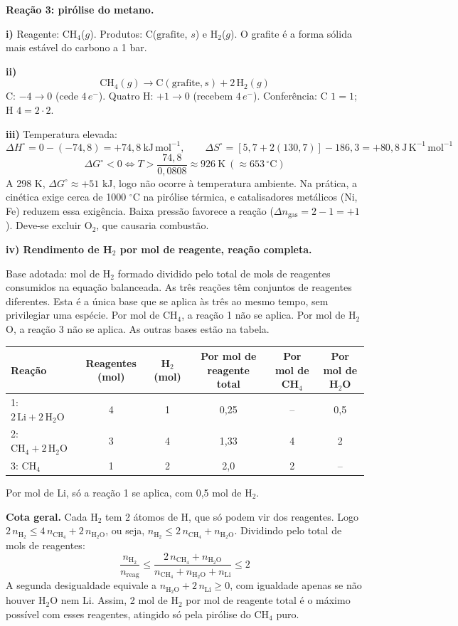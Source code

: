 \documentclass{article}%
\begin{document}
\textbf{Reação 3: pirólise do metano.}

\textbf{i)} Reagente: CH$_4$($g$). Produtos: C($\text{grafite}$, $s$) e H$_2$($g$). O grafite é a forma sólida mais estável do carbono a 1 bar.

\textbf{ii)}
\[ \mathrm{CH_4}(g) \rightarrow \mathrm{C}(\text{grafite}, s) + 2\,\mathrm{H_2}(g) \]
C: $-4 \rightarrow 0$ (cede $4\,e^-$). Quatro H: $+1 \rightarrow 0$ (recebem $4\,e^-$). Conferência: C $1=1$; H $4=2\cdot 2$.

\textbf{iii)} Temperatura elevada:
\[ \Delta H^\circ = 0 - (-74{,}8) = +74{,}8\ \mathrm{kJ\,mol^{-1}}, \qquad \Delta S^\circ = \left[5{,}7 + 2(130{,}7)\right] - 186{,}3 = +80{,}8\ \mathrm{J\,K^{-1}\,mol^{-1}} \]
\[ \Delta G^\circ < 0 \Leftrightarrow T > \frac{74{,}8}{0{,}0808} \approx 926\ \mathrm{K}\ (\approx 653\,^\circ\mathrm{C}) \]
A 298 K, $\Delta G^\circ \approx +51$ kJ, logo não ocorre à temperatura ambiente. Na prática, a cinética exige cerca de 1000 $^\circ$C na pirólise térmica, e catalisadores metálicos (Ni, Fe) reduzem essa exigência. Baixa pressão favorece a reação ($\Delta n_{\mathrm{gas}} = 2 - 1 = +1$). Deve-se excluir O$_2$, que causaria combustão.

\textbf{iv) Rendimento de H$_2$ por mol de reagente, reação completa.}

Base adotada: mol de H$_2$ formado dividido pelo total de mols de reagentes consumidos na equação balanceada. As três reações têm conjuntos de reagentes diferentes. Esta é a única base que se aplica às três ao mesmo tempo, sem privilegiar uma espécie. Por mol de CH$_4$, a reação 1 não se aplica. Por mol de H$_2$O, a reação 3 não se aplica. As outras bases estão na tabela.

\begin{center}
\begin{tabular}{lccccc}
Reação & Reagentes (mol) & H$_2$ (mol) & Por mol de reagente total & Por mol de CH$_4$ & Por mol de H$_2$O \\
\hline
1: $2\,\mathrm{Li} + 2\,\mathrm{H_2O}$ & 4 & 1 & 0,25 & -- & 0,5 \\
2: $\mathrm{CH_4} + 2\,\mathrm{H_2O}$ & 3 & 4 & 1,33 & 4 & 2 \\
3: $\mathrm{CH_4}$ & 1 & 2 & 2,0 & 2 & -- \\
\end{tabular}
\end{center}

Por mol de Li, só a reação 1 se aplica, com 0,5 mol de H$_2$.

\textbf{Cota geral.} Cada H$_2$ tem 2 átomos de H, que só podem vir dos reagentes. Logo $2\,n_{\mathrm{H_2}} \leq 4\,n_{\mathrm{CH_4}} + 2\,n_{\mathrm{H_2O}}$, ou seja, $n_{\mathrm{H_2}} \leq 2\,n_{\mathrm{CH_4}} + n_{\mathrm{H_2O}}$. Dividindo pelo total de mols de reagentes:
\[ \frac{n_{\mathrm{H_2}}}{n_{\text{reag}}} \leq \frac{2\,n_{\mathrm{CH_4}} + n_{\mathrm{H_2O}}}{n_{\mathrm{CH_4}} + n_{\mathrm{H_2O}} + n_{\mathrm{Li}}} \leq 2 \]
A segunda desigualdade equivale a $n_{\mathrm{H_2O}} + 2\,n_{\mathrm{Li}} \geq 0$, com igualdade apenas se não houver H$_2$O nem Li. Assim, 2 mol de H$_2$ por mol de reagente total é o máximo possível com esses reagentes, atingido só pela pirólise do CH$_4$ puro.
\end{document}
